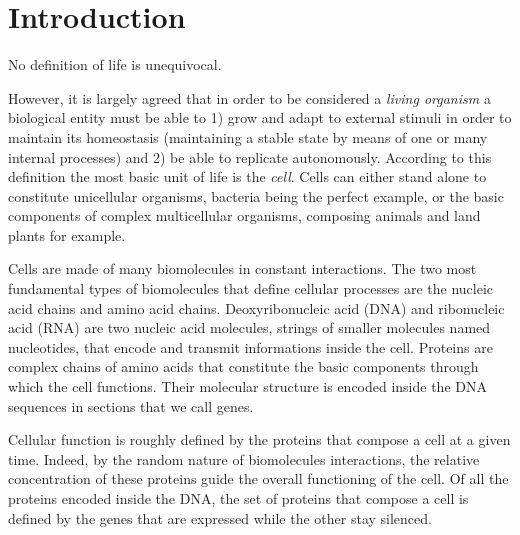 \chapter{Introduction}
\label{chap:intro}


No definition of life is unequivocal.

However, it is largely agreed that in order to be considered a \emph{living organism} a biological entity must be able to 1) grow and adapt to external stimuli in order to maintain its homeostasis (maintaining a stable state by means of one or many internal processes) and 2) be able to replicate autonomously.
According to this definition the most basic unit of life is the \emph{cell}.
Cells can either stand alone to constitute unicellular organisms, bacteria being the perfect example, or the basic components of complex multicellular organisms, composing animals and land plants for example.

Cells are made of many biomolecules in constant interactions.
The two most fundamental types of biomolecules that define cellular processes are the nucleic acid chains and amino acid chains.
Deoxyribonucleic acid (DNA) and ribonucleic acid (RNA) are two nucleic acid molecules, strings of smaller molecules named nucleotides, that encode and transmit informations inside the cell.
Proteins are complex chains of amino acids that constitute the basic components through which the cell functions.
Their molecular structure is encoded inside the DNA sequences in sections that we call genes.

Cellular function is roughly defined by the proteins that compose a cell at a given time.
Indeed, by the random nature of biomolecules interactions, the relative concentration of these proteins guide the overall functioning of the cell.
Of all the proteins encoded inside the DNA, the set of proteins that compose a cell is defined by the genes that are expressed while the other stay silenced.

